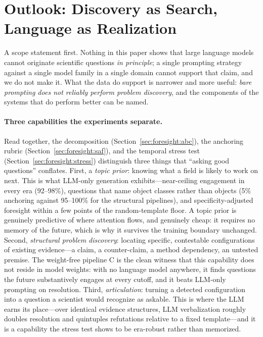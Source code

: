 \section{Outlook: Discovery as Search, Language as Realization}
\label{sec:outlook}

A scope statement first. Nothing in this paper shows that large
language models cannot originate scientific questions \emph{in
principle}; a single prompting strategy against a single model family
in a single domain cannot support that claim, and we do not make it.
What the data do support is narrower and more useful: \emph{bare
prompting does not reliably perform problem discovery}, and the
components of the systems that do perform better can be named.

\paragraph{Three capabilities the experiments separate.} Read together,
the decomposition (Section~\ref{sec:foresight:abc}), the anchoring
rubric (Section~\ref{sec:foresight:saf}), and the temporal stress test
(Section~\ref{sec:foresight:stress}) distinguish three things that
``asking good questions'' conflates. First, a \emph{topic prior}:
knowing what a field is likely to work on next. This is what LLM-only
generation exhibits---near-ceiling engagement in every era (92--98\%),
questions that name object classes rather than objects (5\% anchoring
against 95--100\% for the structural pipelines), and
specificity-adjusted foresight within a few points of the
random-template floor. A topic prior is genuinely predictive of where
attention flows, and genuinely cheap: it requires no memory of the
future, which is why it survives the training boundary unchanged.
Second, \emph{structural problem discovery}: locating specific,
contestable configurations of existing evidence---a claim, a
counter-claim, a method dependency, an untested premise. The
weight-free pipeline C is the clean witness that this capability does
not reside in model weights: with no language model anywhere, it finds
questions the future substantively engages at every cutoff, and it
beats LLM-only prompting on resolution. Third,
\emph{articulation}: turning a detected configuration into a question a
scientist would recognize as askable. This is where the LLM earns its
place---over identical evidence structures, LLM verbalization roughly
doubles resolution and quintuples refutations relative to a fixed
template---and it is a capability the stress test shows to be
era-robust rather than memorized.

